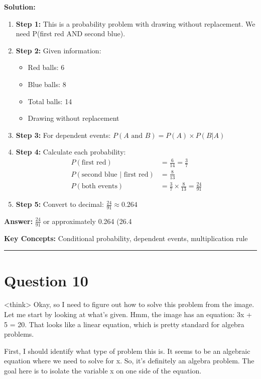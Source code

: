 \documentclass[12pt]{article}
\begin{document}
\textbf{Solution:}
\begin{enumerate}
\item \textbf{Step 1:} This is a probability problem with drawing without replacement. We need P(first red AND second blue).

\item \textbf{Step 2:} Given information:
\begin{itemize}
\item Red balls: 6
\item Blue balls: 8
\item Total balls: 14
\item Drawing without replacement
\end{itemize}

\item \textbf{Step 3:} For dependent events: $P(A \text{ and } B) = P(A) \times P(B|A)$

\item \textbf{Step 4:} Calculate each probability:
\begin{align}
P(\text{first red}) &= \frac{6}{14} = \frac{3}{7} \\
P(\text{second blue | first red}) &= \frac{8}{13} \\
P(\text{both events}) &= \frac{3}{7} \times \frac{8}{13} = \frac{24}{91}
\end{align}

\item \textbf{Step 5:} Convert to decimal: $\frac{24}{91} \approx 0.264$
\end{enumerate}

\textbf{Answer:} $\frac{24}{91}$ or approximately 0.264 (26.4%

\textbf{Key Concepts:} Conditional probability, dependent events, multiplication rule

\hrule
\vspace{1em}

\newpage

\section{Question 10}

<think>
Okay, so I need to figure out how to solve this problem from the image. Let me start by looking at what's given. Hmm, the image has an equation: 3x + 5 = 20. That looks like a linear equation, which is pretty standard for algebra problems.

First, I should identify what type of problem this is. It seems to be an algebraic equation where we need to solve for x. So, it's definitely an algebra problem. The goal here is to isolate the variable x on one side of the equation.
\end{document}
